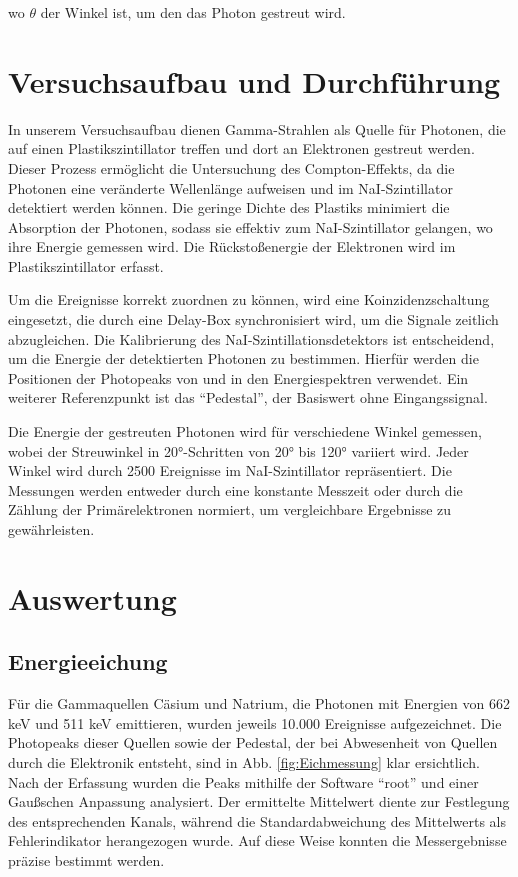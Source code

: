 \documentclass[12pt,a4paper,ngerman]{report}
\begin{document}
wo $\theta$ der Winkel ist, um den das Photon gestreut wird.

	 \chapter{Versuchsaufbau und Durchführung}
		In unserem Versuchsaufbau dienen Gamma-Strahlen als Quelle für Photonen, die auf einen Plastikszintillator treffen und dort an Elektronen gestreut werden. Dieser Prozess ermöglicht die Untersuchung des Compton-Effekts, da die Photonen eine veränderte Wellenlänge aufweisen und im NaI-Szintillator detektiert werden können. Die geringe Dichte des Plastiks minimiert die Absorption der Photonen, sodass sie effektiv zum NaI-Szintillator gelangen, wo ihre Energie gemessen wird. Die Rückstoßenergie der Elektronen wird im Plastikszintillator erfasst.

		Um die Ereignisse korrekt zuordnen zu können, wird eine Koinzidenzschaltung eingesetzt, die durch eine Delay-Box synchronisiert wird, um die Signale zeitlich abzugleichen. Die Kalibrierung des NaI-Szintillationsdetektors ist entscheidend, um die Energie der detektierten Photonen zu bestimmen. Hierfür werden die Positionen der Photopeaks von  und  in den Energiespektren verwendet. Ein weiterer Referenzpunkt ist das “Pedestal”, der Basiswert ohne Eingangssignal.

		Die Energie der gestreuten Photonen wird für verschiedene Winkel gemessen, wobei der Streuwinkel in 20°-Schritten von 20° bis 120° variiert wird. Jeder Winkel wird durch 2500 Ereignisse im NaI-Szintillator repräsentiert. Die Messungen werden entweder durch eine konstante Messzeit oder durch die Zählung der Primärelektronen normiert, um vergleichbare Ergebnisse zu gewährleisten.
	 \chapter{Auswertung} %
		
		  \section{Energieeichung}
			  Für die Gammaquellen Cäsium und Natrium, die Photonen mit Energien von 662 keV und 511 keV emittieren, wurden jeweils 10.000 Ereignisse aufgezeichnet. Die Photopeaks dieser Quellen sowie der Pedestal, der bei Abwesenheit von Quellen durch die Elektronik entsteht, sind in Abb. \vref{fig:Eichmessung} klar ersichtlich. Nach der Erfassung wurden die Peaks mithilfe der Software “root” und einer Gaußschen Anpassung analysiert. Der ermittelte Mittelwert diente zur Festlegung des entsprechenden Kanals, während die Standardabweichung des Mittelwerts als Fehlerindikator herangezogen wurde. Auf diese Weise konnten die Messergebnisse präzise bestimmt werden.
			  
\end{document}
